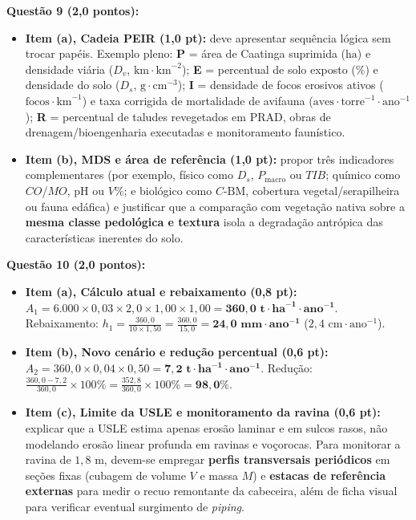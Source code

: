 \begin{boxGabarito}
\textbf{Questão 9 (2,0 pontos):}
\begin{itemize}[leftmargin=1.4em, itemsep=2.5pt]
  \item \textbf{Item (a), Cadeia PEIR (1,0 pt):} deve apresentar sequência lógica sem trocar papéis. Exemplo pleno: \textbf{P} = área de Caatinga suprimida ($\text{ha}$) e densidade viária ($D_v$, $\text{km}\cdot\text{km}^{-2}$); \textbf{E} = percentual de solo exposto ($\%$) e densidade do solo ($D_s$, $\text{g}\cdot\text{cm}^{-3}$); \textbf{I} = densidade de focos erosivos ativos ($\text{focos}\cdot\text{km}^{-1}$) e taxa corrigida de mortalidade de avifauna ($\text{aves}\cdot\text{torre}^{-1}\cdot\text{ano}^{-1}$); \textbf{R} = percentual de taludes revegetados em PRAD, obras de drenagem/bioengenharia executadas e monitoramento faunístico.
  \item \textbf{Item (b), MDS e área de referência (1,0 pt):} propor três indicadores complementares (por exemplo, físico como $D_s$, $P_{\text{macro}}$ ou $TIB$; químico como $CO$/$MO$, pH ou $V\%$; e biológico como $C\text{-BM}$, cobertura vegetal/serapilheira ou fauna edáfica) e justificar que a comparação com vegetação nativa sobre a \textbf{mesma classe pedológica e textura} isola a degradação antrópica das características inerentes do solo.
\end{itemize}

\textbf{Questão 10 (2,0 pontos):}
\begin{itemize}[leftmargin=1.4em, itemsep=2.5pt]
  \item \textbf{Item (a), Cálculo atual e rebaixamento (0,8 pt):}
  $A_1 = 6.000 \times 0{,}03 \times 2{,}0 \times 1{,}00 \times 1{,}00 = \mathbf{360{,}0\text{ t}\cdot\text{ha}^{-1}\cdot\text{ano}^{-1}}$.
  Rebaixamento: $h_1 = \frac{360{,}0}{10 \times 1{,}50} = \frac{360{,}0}{15{,}0} = \mathbf{24{,}0\text{ mm}\cdot\text{ano}^{-1}}$ ($2{,}4\text{ cm}\cdot\text{ano}^{-1}$).
  \item \textbf{Item (b), Novo cenário e redução percentual (0,6 pt):}
  $A_2 = 360{,}0 \times 0{,}04 \times 0{,}50 = \mathbf{7{,}2\text{ t}\cdot\text{ha}^{-1}\cdot\text{ano}^{-1}}$.
  Redução: $\frac{360{,}0 - 7{,}2}{360{,}0}\times 100\% = \frac{352{,}8}{360{,}0}\times 100\% = \mathbf{98{,}0\%}$.
  \item \textbf{Item (c), Limite da USLE e monitoramento da ravina (0,6 pt):} explicar que a USLE estima apenas erosão laminar e em sulcos rasos, não modelando erosão linear profunda em ravinas e voçorocas. Para monitorar a ravina de $1{,}8\text{ m}$, devem-se empregar \textbf{perfis transversais periódicos} em seções fixas (cubagem de volume $V$ e massa $M$) e \textbf{estacas de referência externas} para medir o recuo remontante da cabeceira, além de ficha visual para verificar eventual surgimento de \textit{piping}.
\end{itemize}
\end{boxGabarito}

